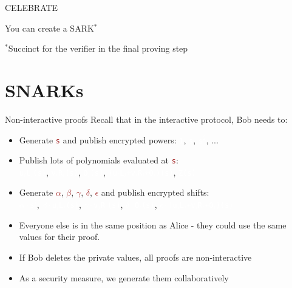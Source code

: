 \documentclass[dvipsnames]{beamer}
\newcommand{\priv}[1]{\textcolor{brown}{\texttt{#1}}}
\newcommand{\enc}[1]{\colorbox{SkyBlue!75}{\textcolor{white}{\texttt{#1}}}}
\begin{document}
    \begin{frame}{CELEBRATE}
        \vspace{2.5cm}
        \begin{center}
        {\Huge You can create a SARK$^*$}
            \\
        \end{center}

        \vspace{2.5cm}
        {\tiny $^*$Succinct for the verifier in the final proving step}
    \end{frame}

    \section{SNARKs}

    \begin{frame}{Non-interactive proofs}
        Recall that in the interactive protocol, Bob needs to:
        \begin{itemize}
            \item Generate \priv{s} and publish encrypted powers: \enc{1}, \enc{s}, \enc{s$^2$}, ...
            \item Publish lots of polynomials evaluated at \priv{s}:\\
            \enc{u$_i$L$_i$(s)}, \enc{v$_i$R$_i$(s)}, \enc{O$_i$(s)}, \enc{(u$_i$L$_i$+v$_i$R$_i$+O$_i$)(s)}, \enc{Z(s)}
            \item Generate \priv{$\alpha$}, \priv{$\beta$}, \priv{$\gamma$}, \priv{$\delta$}, \priv{$\epsilon$} and publish encrypted shifts:\\
            \enc{$\alpha \cdot$s$^i$}, \enc{$\beta \cdot$u$_i$L$_i$(s)}, \enc{$\gamma \cdot$v$_i$R$_i$(s)}, \enc{$\delta \cdot$O$_i$(s)}, \enc{$\epsilon \cdot$(u$_i$L$_i$+v$_i$R$_i$+O$_i$)(s)}
            \item Everyone else is in the same position as Alice - they could use the same values for their proof.
            \item If Bob deletes the private values, all proofs are non-interactive
            \item As a security measure, we generate them collaboratively
        \end{itemize}
    \end{frame}
\end{document}
